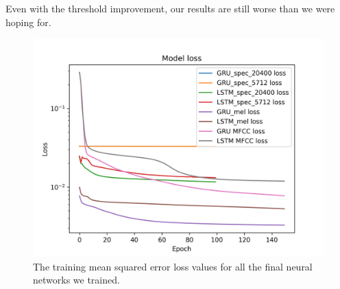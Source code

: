 Even with the threshold improvement, our results are still worse than we were hoping for. 
\begin{figure}[h]
    \centering
	\includegraphics[width=120mm]{./img/all_training_graphs.png}
	\caption{The training mean squared error loss values for all the final neural networks we trained.}
	\label{fig:all_model_training}
\end{figure}